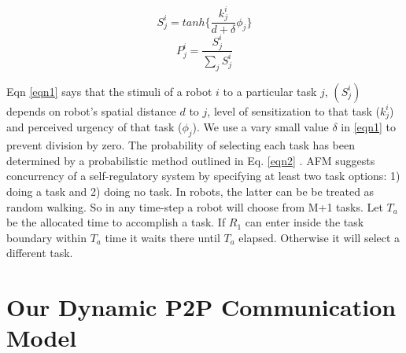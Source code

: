 \documentclass[letterpaper, 10 pt, conference]{ieeeconf}  %
\begin{document}
\begin{small}
\begin{equation}
S_{j}^{i} = tanh\{\frac{k_{j}^{i}}{d+\delta } \phi _{j}\}
\label{eqn1}
\end{equation}
\begin{equation}
P_{j}^{i} = \frac{S_{j}^{i}}{\sum_{j}^{}S_{j}^{i}}
\label{eqn2}
\end{equation}
\end{small}
Eqn \ref{eqn1} says that the stimuli of a robot $i$ to a particular task $j$, $(S_{j}^{i})$ depends on robot's spatial distance $d$ to $j$, level of sensitization to that task ($k_{j}^{i}$) and perceived urgency of that task ($\phi _{j}$). We use a vary small value $\delta$ in \ref{eqn1} to prevent  division by zero. The probability of selecting each task has been determined by a probabilistic method outlined in Eq. \ref{eqn2} . 
AFM suggests concurrency of a self-regulatory system by specifying at least two task options: 1) doing a task and 2) doing no task. In robots, the latter can be   be treated as random walking. So in any time-step a robot will choose from M+1 tasks. Let $T_a$ be the allocated time to accomplish a task. If $R_1$ can enter inside the task boundary within $T_a$ time it waits there until $T_a$ elapsed. Otherwise it will select a different task. 

\section{Our Dynamic P2P Communication Model}
\label{sec:comm}
\end{document}
